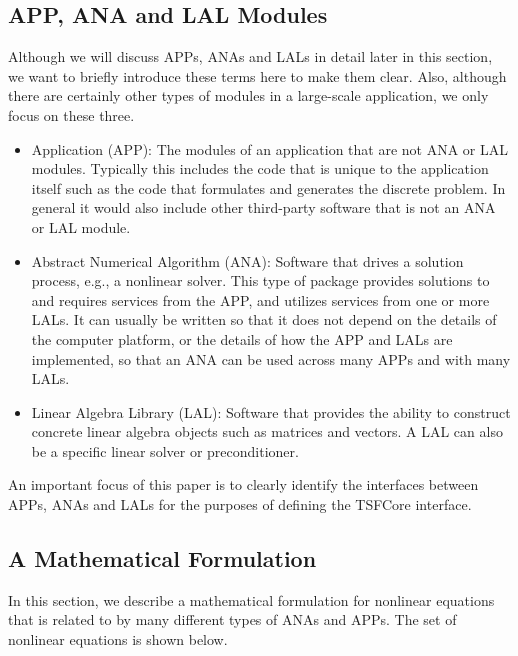 \documentclass[10pt,fleqn]{article}
\begin{document}
%
\subsection{APP, ANA and LAL Modules}
\label{tsfcore:sec:module_overview}
Although we will discuss APPs, ANAs and LALs in detail later in this
section, we want to briefly introduce these terms here to make them
clear.  Also, although there are certainly other types of modules 
in a large-scale application, we only focus on these three.
\begin{itemize}
\item Application (APP):  The modules of an application that are not
ANA or LAL modules.  Typically this includes 
the code that is unique to the application 
itself such as the code that formulates and
generates the discrete problem.  In general it would also include other
third-party software that is not an ANA or LAL module.
\item Abstract Numerical Algorithm (ANA):  Software that drives a 
solution process, e.g., a nonlinear solver.  This type of package 
provides solutions to and requires services from
the APP, and utilizes services from one or more LALs.  It can usually 
be written so that
it does not depend on the details of the computer platform, or the
details of how the APP and LALs are implemented, so that an ANA
can be used across many APPs and with many LALs.
\item Linear Algebra Library (LAL): Software that provides the 
ability to construct
concrete linear algebra objects such as matrices and vectors.  
A LAL can also be a specific linear solver or preconditioner.
\end{itemize}

An important focus of this paper is to clearly identify the interfaces 
between APPs, ANAs 
and LALs for the purposes of defining the TSFCore interface.

%

%
\subsection{A Mathematical Formulation}
\label{tsfcore:sec:math}
%

In this section, we describe a mathematical formulation for nonlinear
equations that is related to by many different types of ANAs and APPs.
The set of nonlinear equations is shown below.
\end{document}
